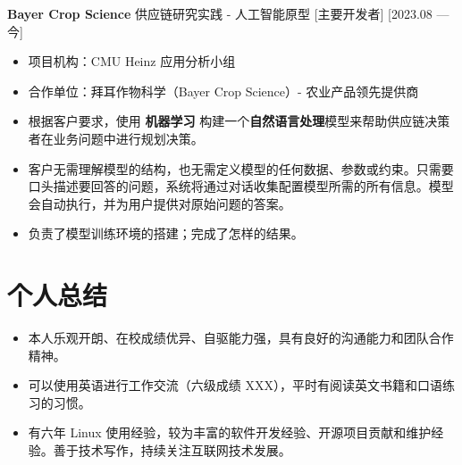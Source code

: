\documentclass{resume}
\begin{document}
\ResumeItem[Bayer Crop Science]
{\textbf{Bayer Crop Science} 供应链研究实践 - 人工智能原型} %
[主要开发者]
[2023.08 — 今]

\begin{itemize}
  \item 项目机构：CMU Heinz 应用分析小组
  \item 合作单位：拜耳作物科学（Bayer Crop Science）- 农业产品领先提供商
  \item 根据客户要求，使用 \textbf{机器学习} 构建一个\textbf{自然语言处理}模型来帮助供应链决策者在业务问题中进行规划决策。
  \item 客户无需理解模型的结构，也无需定义模型的任何数据、参数或约束。只需要口头描述要回答的问题，系统将通过对话收集配置模型所需的所有信息。模型会自动执行，并为用户提供对原始问题的答案。
  \item 负责了模型训练环境的搭建；完成了怎样的结果。
\end{itemize}

\section{个人总结}

\begin{itemize}
  \item 本人乐观开朗、在校成绩优异、自驱能力强，具有良好的沟通能力和团队合作精神。
  \item 可以使用英语进行工作交流（六级成绩 XXX），平时有阅读英文书籍和口语练习的习惯。
  \item 有六年 Linux 使用经验，较为丰富的软件开发经验、开源项目贡献和维护经验。善于技术写作，持续关注互联网技术发展。
\end{itemize}
\end{document}
